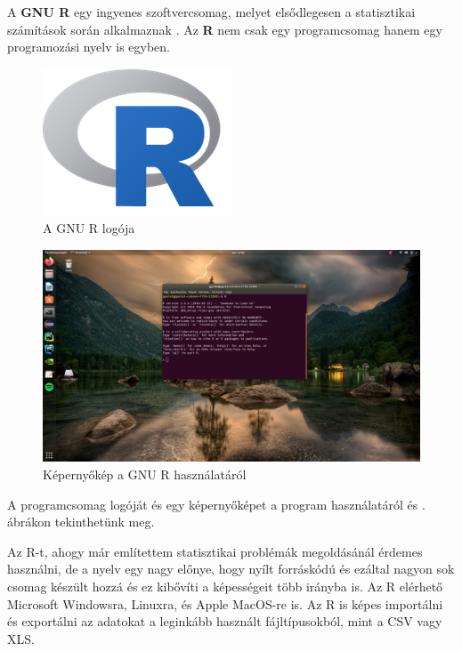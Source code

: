 
A \textbf{GNU R} egy ingyenes szoftvercsomag, melyet elsődlegesen a
statisztikai számítások során alkalmaznak \cite{gnur}.
Az \textbf{R} nem csak egy
programcsomag hanem egy programozási nyelv is egyben.

\begin{figure}[h!]
\centering
\includegraphics{img/R_logo.png}
\caption{A GNU R logója}
\label{fig:r-logo}
\end{figure}

\begin{figure}[h!]
\centering
\includegraphics[width=\textwidth]{img/R_screen.png}
\caption{Képernyőkép a GNU R használatáról}
\label{fig:r-screenshot}
\end{figure}

A programcsomag logóját és egy képernyőképet a program használatáról  és . ábrákon tekinthetünk meg.

Az R-t, ahogy már
említettem statisztikai problémák megoldásánál érdemes használni, de a
nyelv egy nagy előnye, hogy nyílt forráskódú és ezáltal nagyon sok
csomag készült hozzá és ez kibővíti a képességeit több irányba is. Az R
elérhető Microsoft Windowsra, Linuxra, és Apple MacOS-re is. Az R is
képes importálni és exportálni az adatokat a leginkább használt
fájltípusokból, mint a CSV vagy XLS.

